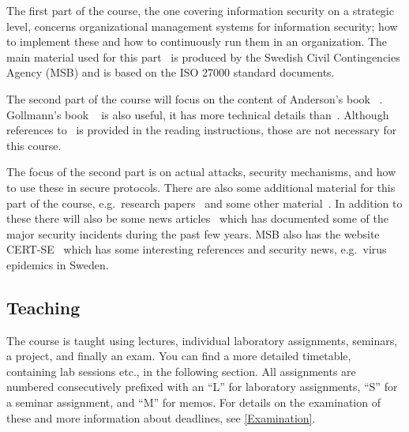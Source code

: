 The first part of the course, the one covering information security on 
a strategic level, concerns organizational management systems for information 
security; how to implement these and how to continuously run them in an 
organization.
The main material used for this part~\cite{%
  MSB2011itm,MSB2011sle,MSB2011p,%
	MSB2011v,MSB2011r,MSB2011gap,MSB2011gb,%
	MSB2011vs,MSB2011us,MSB2011upo,%
	MSB2011pg,MSB2011koa,MSB2011i,%
	MSB2011o,MSB2011g,MSB2011lg,%
	MSB2011ulo,MSB2011kf,MSB2011fa%
} is produced by the Swedish Civil Contingencies Agency (MSB) and is based on 
the ISO 27000 standard documents.

The second part of the course will focus on the content of Anderson's book 
~\cite{Anderson2008sea}.
Gollmann's book ~\cite{Gollmann2011cs} is also 
useful, it has more technical details than~\cite{Anderson2008sea}.
Although references to~\cite{Gollmann2011cs} is provided in the reading 
instructions, those are not necessary for this course.

The focus of the second part is on actual attacks, security mechanisms, and how 
to use these in secure protocols.
There are also some additional material for this part of the course, 
e.g.~research papers~\cite{%
  Juels2012sha,%
  Komanduri2011opa%
} and some other material~\cite{Bosk2013gl,Bosk2013itn}.
In addition to these there will also be some news articles~\cite{%
  Honan2012haa,%
  Zetter2012hnt,%
  Fisher2011rsa,%
  Hunt2011abs,%
  Cluley2012twp,%
  Oberheide2010bao,%
  Cubrilovic2009rhf%
} which has documented some of the major security incidents during the past few 
years.
MSB also has the website CERT-SE~\cite{CERT-SE} which has some interesting 
references and security news, e.g.~virus epidemics in Sweden.

\subsection{Teaching}

The course is taught using lectures, individual laboratory assignments, 
seminars, a project, and finally an exam.
You can find a more detailed timetable, containing lab sessions etc., in the 
following section.
All assignments are numbered consecutively prefixed with an \enquote{L} for 
laboratory assignments, \enquote{S} for a seminar assignment, and \enquote{M} 
for memos.
For details on the examination of these and more information about deadlines, 
see \cref{Examination}.

